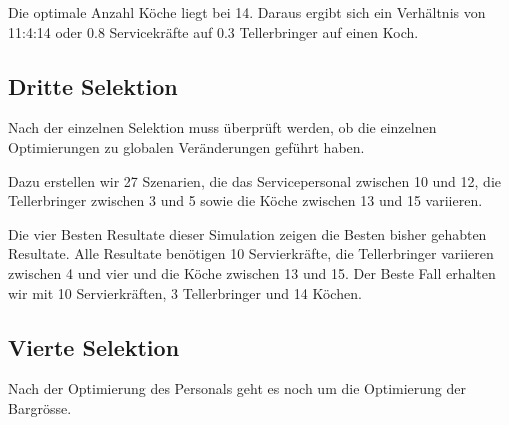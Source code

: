 \documentclass[ngerman,a4paper,12pt]{scrreprt}
\begin{document}
				Die optimale Anzahl Köche liegt bei 14. Daraus ergibt sich ein Verhältnis von 11:4:14 oder 0.8 Servicekräfte auf 0.3 Tellerbringer auf einen Koch.

		
		\subsection{Dritte Selektion}
			Nach der einzelnen Selektion muss überprüft werden, ob die einzelnen Optimierungen zu globalen Veränderungen geführt haben.
			
			Dazu erstellen wir 27 Szenarien, die das Servicepersonal zwischen 10 und 12, die Tellerbringer zwischen 3 und 5 sowie die Köche zwischen 13 und 15 variieren.
			
			Die vier Besten Resultate dieser Simulation zeigen die Besten bisher gehabten Resultate. Alle Resultate benötigen 10 Servierkräfte, die Tellerbringer variieren zwischen 4 und vier und die Köche zwischen 13 und 15. Der Beste Fall erhalten wir mit 10 Servierkräften, 3 Tellerbringer und 14 Köchen.
			
		
		\subsection{Vierte Selektion}
			Nach der Optimierung des Personals geht es noch um die Optimierung der Bargrösse.
			
			
			
			
\end{document}
